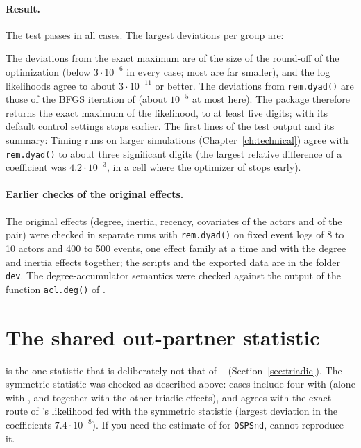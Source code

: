 \paragraph{Result.} The test passes in all cases. The largest deviations per group are:
\begin{table}[h]
\centering\footnotesize
\caption{Largest deviation from \relevent{}, by group of cases (Stata~17, \nwrem{}~\pkgversion{}).}

\end{table}
The deviations from the exact maximum are of the size of the round-off of the optimization (below $3\cdot10^{-6}$ in every case; most are far smaller), and the log likelihoods agree to about $3\cdot10^{-11}$ or better. The deviations from \texttt{rem.dyad()} are those of the BFGS iteration of \relevent{} (about $10^{-5}$ at most here). The package therefore returns the exact maximum of the likelihood, to at least five digits; \relevent{} with its default control settings stops earlier. The first lines of the test output and its summary:
Timing runs on larger simulations (Chapter~\ref{ch:technical}) agree with \texttt{rem.dyad()} to about three significant digits (the largest relative difference of a coefficient was $4.2\cdot10^{-3}$, in a cell where the optimizer of \relevent{} stops early).

\paragraph{Earlier checks of the original effects.} The original effects (degree, inertia, recency, covariates of the actors and of the pair) were checked in separate runs with \texttt{rem.dyad()} on fixed event logs of 8 to 10 actors and 400 to 500 events, one effect family at a time and with the degree and inertia effects together; the scripts and the exported data are in the folder \texttt{dev}. The degree-accumulator semantics were checked against the output of the function \texttt{acl.deg()} of \relevent{}.

\section{The shared out-partner statistic}\label{sec:val-osp}

 is the one statistic that is deliberately not that of \relevent{}~\releventver{} (Section~\ref{sec:triadic}). The symmetric statistic was checked as described above: \nvalcases{} cases include four with  (alone with , and together with the other triadic effects), and \nwrem{} agrees with the exact route of \relevent{}'s likelihood fed with the symmetric statistic (largest deviation in the coefficients $7.4\cdot10^{-8}$). If you need the estimate of \relevent{} for \texttt{OSPSnd}, \nwrem{} cannot reproduce it.


